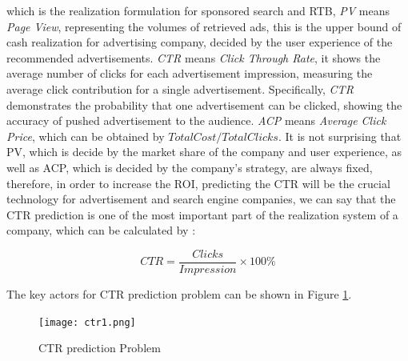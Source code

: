 which is the realization formulation for sponsored search and RTB, \textit{PV} means \textit{Page View}, representing the volumes of retrieved ads, this is the upper bound of cash realization for advertising company, decided by the user experience of the recommended advertisements. \textit{CTR} means \textit{Click Through Rate}, it shows the average number of clicks for each advertisement impression, measuring the average click contribution for a single advertisement. Specifically, \textit{CTR} demonstrates the probability that one advertisement can be clicked, showing the accuracy of pushed advertisement to the audience. \textit{ACP} means \textit{Average Click Price}, which can be obtained by \(Total Cost / Total Clicks\). It is not surprising that PV, which is decide by the market share of the company and user experience, as well as ACP, which is decided by the company's strategy, are always fixed, therefore, in order to increase the ROI, predicting the CTR will be the crucial technology for advertisement and search engine companies, we can say that the CTR prediction is one of the most important part of the realization system of a company, which can be calculated by :

\begin{equation}
CTR = \frac{Clicks}{Impression} \times 100\%
\end{equation}

The key actors for CTR prediction problem can be shown in Figure \ref{fig:ctr}.

\begin{figure}[h]
\centering
\texttt{[image: ctr1.png]}
\caption{CTR prediction Problem}
\label{fig:ctr}
\end{figure}

